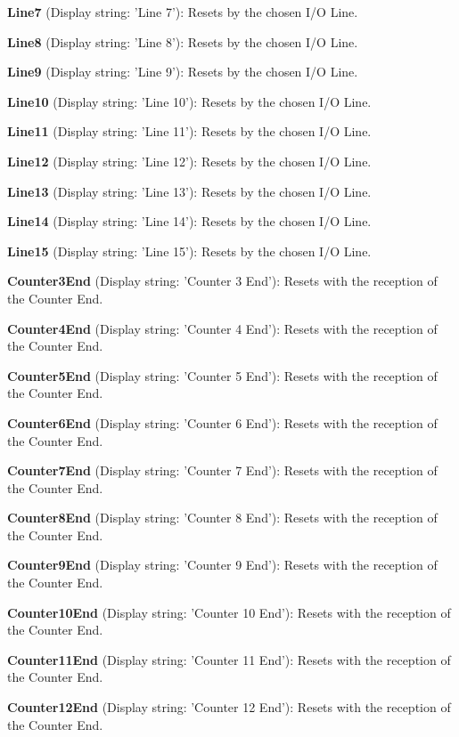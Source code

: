 \begin{DoxyItemize}
\item {\bfseries Line7} (Display string\+: 'Line 7')\+: Resets by the chosen I/\+O Line.
\item {\bfseries Line8} (Display string\+: 'Line 8')\+: Resets by the chosen I/\+O Line.
\item {\bfseries Line9} (Display string\+: 'Line 9')\+: Resets by the chosen I/\+O Line.
\item {\bfseries Line10} (Display string\+: 'Line 10')\+: Resets by the chosen I/\+O Line.
\item {\bfseries Line11} (Display string\+: 'Line 11')\+: Resets by the chosen I/\+O Line.
\item {\bfseries Line12} (Display string\+: 'Line 12')\+: Resets by the chosen I/\+O Line.
\item {\bfseries Line13} (Display string\+: 'Line 13')\+: Resets by the chosen I/\+O Line.
\item {\bfseries Line14} (Display string\+: 'Line 14')\+: Resets by the chosen I/\+O Line.
\item {\bfseries Line15} (Display string\+: 'Line 15')\+: Resets by the chosen I/\+O Line.
\item {\bfseries Counter3\+End} (Display string\+: 'Counter 3 End')\+: Resets with the reception of the Counter End.
\item {\bfseries Counter4\+End} (Display string\+: 'Counter 4 End')\+: Resets with the reception of the Counter End.
\item {\bfseries Counter5\+End} (Display string\+: 'Counter 5 End')\+: Resets with the reception of the Counter End.
\item {\bfseries Counter6\+End} (Display string\+: 'Counter 6 End')\+: Resets with the reception of the Counter End.
\item {\bfseries Counter7\+End} (Display string\+: 'Counter 7 End')\+: Resets with the reception of the Counter End.
\item {\bfseries Counter8\+End} (Display string\+: 'Counter 8 End')\+: Resets with the reception of the Counter End.
\item {\bfseries Counter9\+End} (Display string\+: 'Counter 9 End')\+: Resets with the reception of the Counter End.
\item {\bfseries Counter10\+End} (Display string\+: 'Counter 10 End')\+: Resets with the reception of the Counter End.
\item {\bfseries Counter11\+End} (Display string\+: 'Counter 11 End')\+: Resets with the reception of the Counter End.
\item {\bfseries Counter12\+End} (Display string\+: 'Counter 12 End')\+: Resets with the reception of the Counter End.

\end{DoxyItemize}
